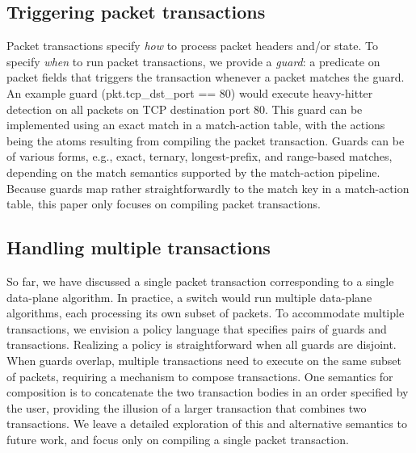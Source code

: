 \subsection{Triggering packet transactions}
\label{ss:guards}
Packet transactions specify \textit{how} to process packet headers and/or
state.  To specify {\em when} to run packet transactions, we provide a {\em
guard}: a predicate on packet fields that triggers the transaction whenever a
packet matches the guard. An example guard (pkt.tcp\_dst\_port == 80) would execute
heavy-hitter detection on all packets on TCP destination port 80. This guard can
be implemented using an exact match in a match-action table, with the actions
being the atoms resulting from compiling the packet transaction. Guards can be of various forms,
e.g., exact, ternary, longest-prefix, and range-based matches, depending on the
match semantics supported by the match-action pipeline. Because guards map
rather straightforwardly to the match key in a match-action table, this paper only
focuses on compiling packet transactions.


\subsection{Handling multiple transactions}
\label{ss:multiple}
So far, we have discussed a single packet transaction corresponding to a single
data-plane algorithm. In practice, a switch
would run multiple data-plane algorithms, each processing its own subset of
packets. To accommodate multiple transactions, we envision a policy
language that specifies pairs of guards and transactions. Realizing a policy is
straightforward when all guards are disjoint. When guards overlap, multiple
transactions need to execute on the same subset of packets, requiring a
mechanism to compose transactions. One semantics for composition is to concatenate the two
transaction bodies in an order specified by the user, providing the illusion of
a larger transaction that combines two transactions. We leave a detailed
exploration of this and alternative semantics to future work,
and focus only on compiling a single packet transaction.


